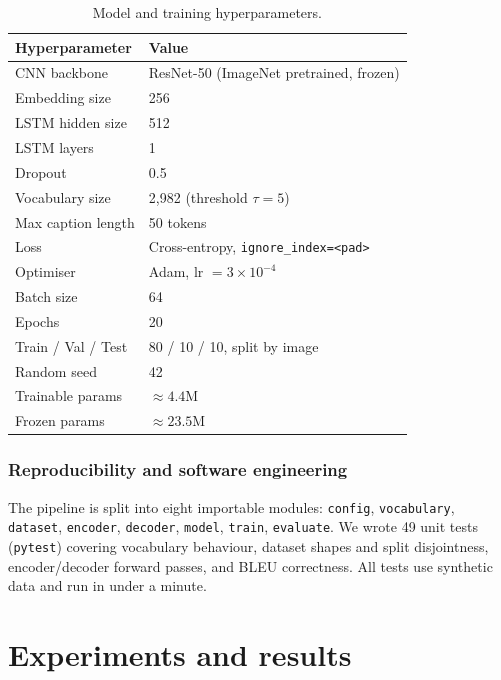 \documentclass{article}
\begin{document}
\begin{table}[h]
  \caption{Model and training hyperparameters.}
  \label{tab:hyperparams}
  \centering
  \begin{tabular}{ll}
    \toprule
    Hyperparameter & Value \\
    \midrule
    CNN backbone         & ResNet-50 (ImageNet pretrained, frozen) \\
    Embedding size       & 256 \\
    LSTM hidden size     & 512 \\
    LSTM layers          & 1 \\
    Dropout              & 0.5 \\
    Vocabulary size      & 2{,}982 (threshold $\tau=5$) \\
    Max caption length   & 50 tokens \\
    \midrule
    Loss                 & Cross-entropy, \texttt{ignore\_index=<pad>} \\
    Optimiser            & Adam, lr $= 3\times10^{-4}$ \\
    Batch size           & 64 \\
    Epochs               & 20 \\
    Train / Val / Test   & 80 / 10 / 10, split by image \\
    Random seed          & 42 \\
    Trainable params     & $\approx 4.4$M \\
    Frozen params        & $\approx 23.5$M \\
    \bottomrule
  \end{tabular}
\end{table}

\subsubsection{Reproducibility and software engineering}

The pipeline is split into eight importable modules:
\texttt{config}, \texttt{vocabulary}, \texttt{dataset}, \texttt{encoder},
\texttt{decoder}, \texttt{model}, \texttt{train}, \texttt{evaluate}.
We wrote 49 unit tests (\texttt{pytest}) covering vocabulary behaviour, dataset
shapes and split disjointness, encoder/decoder forward passes, and BLEU
correctness. All tests use synthetic data and run in under a minute.

\section{Experiments and results}
\end{document}

